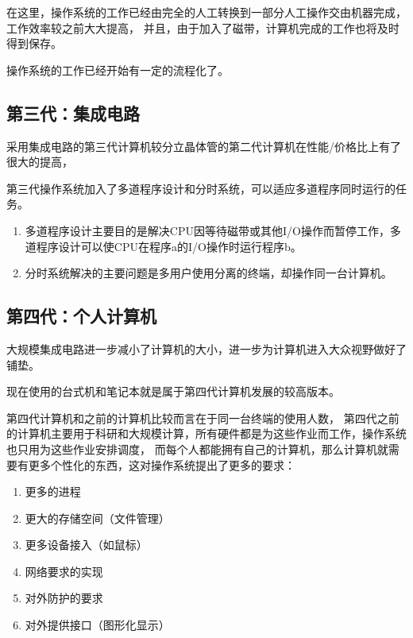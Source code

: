 在这里，操作系统的工作已经由完全的人工转换到一部分人工操作交由机器完成，工作效率较之前大大提高，
并且，由于加入了磁带，计算机完成的工作也将及时得到保存。

操作系统的工作已经开始有一定的流程化了。


\subsection{第三代：集成电路}

采用集成电路的第三代计算机较分立晶体管的第二代计算机在性能/价格比上有了很大的提高，

第三代操作系统加入了多道程序设计和分时系统，可以适应多道程序同时运行的任务。
\begin{enumerate}
  \item 多道程序设计主要目的是解决CPU因等待磁带或其他I/O操作而暂停工作，多道程序设计可以使CPU在程序a的I/O操作时运行程序b\cite{tanenbaum2009modern}。
  \item 分时系统解决的主要问题是多用户使用分离的终端，却操作同一台计算机。
\end{enumerate}


\subsection{第四代：个人计算机}

大规模集成电路进一步减小了计算机的大小，进一步为计算机进入大众视野做好了铺垫。

现在使用的台式机和笔记本就是属于第四代计算机发展的较高版本。

第四代计算机和之前的计算机比较而言在于同一台终端的使用人数，
第四代之前的计算机主要用于科研和大规模计算，所有硬件都是为这些作业而工作，操作系统也只用为这些作业安排调度，
而每个人都能拥有自己的计算机，那么计算机就需要有更多个性化的东西，这对操作系统提出了更多的要求：

\begin{enumerate}
  \item 更多的进程
  \item 更大的存储空间（文件管理）
  \item 更多设备接入（如鼠标）
  \item 网络要求的实现
  \item 对外防护的要求
  \item 对外提供接口（图形化显示）
\end{enumerate}


